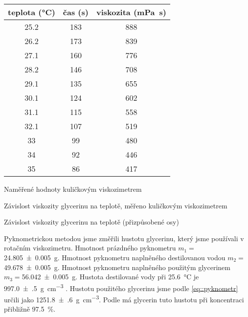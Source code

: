 \begin{tabulka}[htbp]
\centering
\begin{tabular}{ccc}
teplota (\si{\degreeCelsius}) & čas (\si{\s}) & viskozita (\si{\milli\pascal\s}) \\ \hline 
25.2	&		183	& 888 \\
26.2	&		173	& 839 \\
27.1	&		160	& 776 \\
28.2	&		146	& 708 \\
29.1	&		135	& 655 \\
30.1	&		124	& 602 \\
31.1	&		115	& 558 \\
32.1	&		107	& 519 \\
33		&		99	& 480 \\
34		&		92	& 446 \\
35		&		86	& 417 \\
\end{tabular}
\caption{Naměřené hodnoty kuličkovým viskozimetrem}
\label{tab::teplota}
\end{tabulka}


\begin{graph}[htbp] 
\centering

\caption{Závislost viskozity glycerinu na teplotě, měřeno kuličkovým viskozimetrem}
\label{grp::kulickovej}
\end{graph}

\begin{graph}[htbp] 
\centering

\caption{Závislost viskozity glycerinu na teplotě (přizpůsobené osy)}
\label{grp::kulickovejadapt}
\end{graph}

Pyknometrickou metodou jsme změřili hustotu glycerinu, který jsme používali v rotačním viskozimetru.
Hmotnost prázdného pyknometru $m_1 = $\SI{24.805(5)}{\g}.
Hmotnost pyknometru naplněného destilovanou vodou $m_2 =$\SI{49.678(5)}{\g}.
Hmotnost pyknometru naplněného použitým glycerinem $m_3 = $\SI{56.042(5)}{\g}.
Hustota destilované vody při \SI{25.6}{\degreeCelsius} je \SI{997.0(5)}{\g\per\cm\cubed} \cite{hustotavody}.
Hustotu použitého glycerinu jsme podle \eqref{eq::pyknometr} určili jako \SI{1251.8(6)}{\g\per\cm\cubed}.
Podle \cite{skripta} má glycerin tuto hustotu při koncentraci přibližně \SI{97.5}{\percent}.